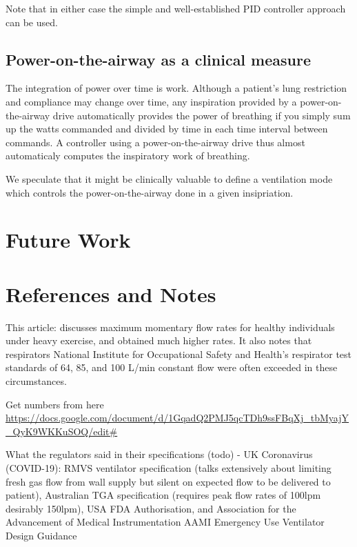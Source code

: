 \documentclass[conference]{article}
\begin{document}
Note that in either case the simple and well-established PID controller
approach can be used.

\subsection{Power-on-the-airway as a clinical measure}

The integration of power over time is work. Although a patient's
lung restriction and compliance may change over time, any inspiration
provided by a power-on-the-airway drive automatically provides
the power of breathing if you simply sum up the watts commanded
and divided by time in each time interval between commands.
A controller using a power-on-the-airway drive thus almost
automaticaly computes the inspiratory work of breathing.

We speculate that it might be clinically valuable to
define a ventilation mode which controls the power-on-the-airway
done in a given insipriation.

\section{Future Work}


\section{References and Notes}

This article: \cite{coyne2006inspiratory}
discusses maximum momentary flow rates for healthy individuals under
heavy exercise, and obtained much higher rates. It also notes that
respirators National Institute for Occupational Safety and Health's respirator test standards of 64, 85, and 100 L/min constant flow
were often exceeded in these circumstances.

Get numbers from here
\url{https://docs.google.com/document/d/1GqadQ2PMJ5qcTDh9ssFBqXj_tbMyajY_QyK9WKKuSOQ/edit#}

What the regulators said in their specifications (todo) - UK Coronavirus (COVID-19): RMVS ventilator specification (talks extensively about limiting fresh gas flow from wall supply but silent on expected flow to be delivered to patient),  Australian TGA specification (requires peak flow rates of 100lpm desirably 150lpm), USA FDA Authorisation, and Association for the Advancement of Medical Instrumentation AAMI Emergency Use Ventilator Design Guidance




\printbibheading

\printbibliography
\end{document}
